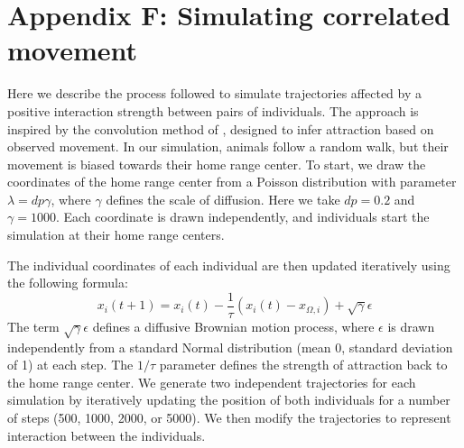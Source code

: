 \documentclass[11pt]{article}
\begin{document}
\section*{Appendix F: Simulating correlated movement}
Here we describe the process followed to simulate trajectories affected by a positive interaction strength between pairs of individuals. The approach is inspired by the convolution method of \citet{Scharf2018}, designed to infer attraction based on observed movement. In our simulation, animals follow a random walk, but their movement is biased towards their home range center. To start, we draw the coordinates of the home range center from a Poisson distribution with parameter $\lambda=dp\gamma$, where $\gamma$ defines the scale of diffusion. Here we take $dp=0.2$ and $\gamma=1000$. Each coordinate is drawn independently, and individuals start the simulation at their home range centers. 

The individual coordinates of each individual are then updated iteratively using the following formula:
\begin{equation}
	x_i(t+1)=x_i(t)-\frac{1}{\tau}(x_i(t)-x_{\Omega,i})+\sqrt{\gamma}\epsilon
\end{equation}
The term $\sqrt\gamma\epsilon$ defines a diffusive Brownian motion process, where $\epsilon$ is drawn independently from a standard Normal distribution (mean 0, standard deviation of 1) at each step. The $1/\tau$ parameter defines the strength of attraction back to the home range center. 
We generate two independent trajectories for each simulation by iteratively updating the position of both individuals for a number of steps (500, 1000, 2000, or 5000). 
We then modify the trajectories to represent interaction between the individuals. 





\clearpage
\end{document}
